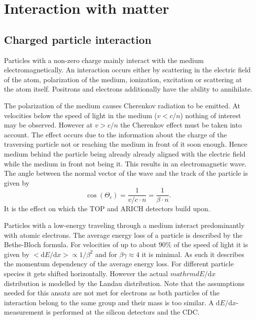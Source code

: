 \section{Interaction with matter}
\label{sec:interaction_with_matter}

\subsection{Charged particle interaction}
\label{subsec:interaction_with_matter}

Particles with a non-zero charge mainly interact with the medium electromagnetically. An interaction occurs either by scattering in the electric field of the atom, polarization of the medium, ionization, excitation or scattering at the atom itself. Positrons and electrons additionally have the ability to annihilate.

The polarization of the medium causes Cherenkov radiation to be emitted. At velocities below the speed of light in the medium ($v < c/n$) nothing of interest may be observed. However at $v > c/n$ the Cherenkov effect must be taken into account. The effect occurs due to the information about the charge of the traversing particle not or reaching the medium in front of it soon enough. Hence medium behind the particle being already already aligned with the electric field while the medium in front not being it. This results in an electromagnetic wave. The angle between the normal vector of the wave and the track of the particle is given by
\begin{equation*}
	\cos(\Theta_{c}) = \frac{1}{v/c \cdot n} = \frac{1}{\beta \cdot n}
	\mathrm{.}
\end{equation*}
It is the effect on which the TOP and ARICH detectors build upon.

Particles with a low-energy traveling through a medium interact predominantly with atomic electrons. The average energy loss of a particle is described by the Bethe-Bloch formula. For velocities of up to about $90\%$ of the speed of light it is given by $<\mathrm{d}E/\mathrm{d}x> \propto 1/{\beta^2}$ and for $\beta \gamma \approx 4$ it is minimal. As such it describes the momentum dependency of the average energy loss. For different particle species it gets shifted horizontally. However the actual $mathrm{d}E/\mathrm{d}x$ distribution is modelled by the Landau distribution. Note that the assumptions needed for this ansatz are not met for electrons as both particles of the interaction belong to the same group and their mass is too similar.
A $\mathrm{d}E/\mathrm{d}x$-measurement is performed at the silicon detectors and the CDC.

